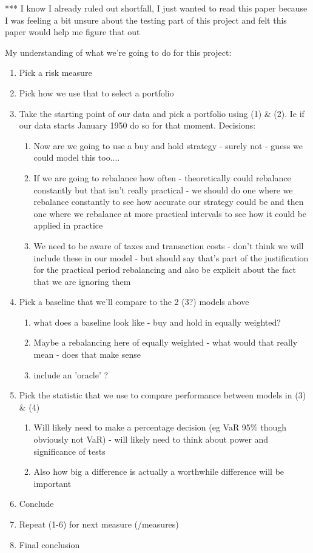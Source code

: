 \documentclass[12pt,a4paper]{article}
\newcommand{\be}{\begin{enumerate}}
\newcommand{\ee}{\end{enumerate}}
\begin{document}
*** I know I already ruled out shortfall, I just wanted to read this paper because I was feeling a bit unsure about the testing part of this project and felt this paper would help me figure that out

My understanding of what we're going to do for this project:

\be
\item Pick a risk measure
\item Pick how we use that to select a portfolio
\item Take the starting point of our data and pick a portfolio using (1) \& (2). Ie if our data starts January 1950 do so for that moment. Decisions:  
\be
	\item Now are we going to use a buy and hold strategy - surely not - guess we could model this too....
	\item If we are going to rebalance how often - theoretically could rebalance constantly but that isn't really practical - we should do one where we rebalance constantly to see how accurate our strategy could be and then one where we rebalance at more practical intervals to see how it could be applied in practice 
	\item We need to be aware of taxes and transaction costs - don't think we will include these in our model - but should say that's part of the justification for the practical period rebalancing and also be explicit about the fact that we are ignoring them
	\ee
\item Pick a baseline that we'll compare to the 2 (3?) models above
\be
	\item what does a baseline look like - buy and hold in equally weighted? 
	\item  Maybe a rebalancing here of equally weighted - what would that really mean - does that make sense
	\item include an 'oracle' ?
	\ee
\item Pick the statistic that we use to compare performance between models in (3) \& (4) 
\be
	\item Will likely need to make a percentage decision (eg VaR 95\% though obviously not VaR) - will likely need to think about power and significance of tests
	\item Also how big a difference is actually a worthwhile difference will be important
	\ee
\item Conclude
\item Repeat (1-6) for next measure (/measures)
\item Final conclusion
\ee
\end{document}
